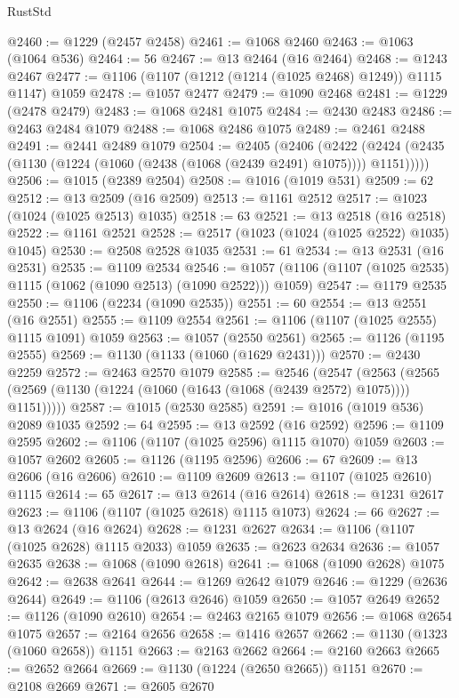 \begin{lexlean}{RustStd}
\begin{coremodule}
@2460 := @1229 (@2457 @2458)
@2461 := @1068 @2460
@2463 := @1063 (@1064 @536)
@2464 := 56
@2467 := @13 @2464 (@16 @2464)
@2468 := @1243 @2467
@2477 := @1106 (@1107 (@1212 (@1214 (@1025 @2468) @1249)) @1115 @1147) @1059
@2478 := @1057 @2477
@2479 := @1090 @2468
@2481 := @1229 (@2478 @2479)
@2483 := @1068 @2481 @1075
@2484 := @2430 @2483
@2486 := @2463 @2484 @1079
@2488 := @1068 @2486 @1075
@2489 := @2461 @2488
@2491 := @2441 @2489 @1079
@2504 := @2405
    (@2406
      (@2422 (@2424 (@2435 (@1130 (@1224 (@1060 (@2438 (@1068 (@2439 @2491) @1075)))) @1151)))))
@2506 := @1015 (@2389 @2504)
@2508 := @1016 (@1019 @531)
@2509 := 62
@2512 := @13 @2509 (@16 @2509)
@2513 := @1161 @2512
@2517 := @1023 (@1024 (@1025 @2513) @1035)
@2518 := 63
@2521 := @13 @2518 (@16 @2518)
@2522 := @1161 @2521
@2528 := @2517 (@1023 (@1024 (@1025 @2522) @1035) @1045)
@2530 := @2508 @2528 @1035
@2531 := 61
@2534 := @13 @2531 (@16 @2531)
@2535 := @1109 @2534
@2546 := @1057 (@1106 (@1107 (@1025 @2535) @1115 (@1062 (@1090 @2513) (@1090 @2522))) @1059)
@2547 := @1179 @2535
@2550 := @1106 (@2234 (@1090 @2535))
@2551 := 60
@2554 := @13 @2551 (@16 @2551)
@2555 := @1109 @2554
@2561 := @1106 (@1107 (@1025 @2555) @1115 @1091) @1059
@2563 := @1057 (@2550 @2561)
@2565 := @1126 (@1195 @2555)
@2569 := @1130 (@1133 (@1060 (@1629 @2431)))
@2570 := @2430 @2259
@2572 := @2463 @2570 @1079
@2585 := @2546
    (@2547
      (@2563 (@2565 (@2569 (@1130 (@1224 (@1060 (@1643 (@1068 (@2439 @2572) @1075)))) @1151)))))
@2587 := @1015 (@2530 @2585)
@2591 := @1016 (@1019 @536) @2089 @1035
@2592 := 64
@2595 := @13 @2592 (@16 @2592)
@2596 := @1109 @2595
@2602 := @1106 (@1107 (@1025 @2596) @1115 @1070) @1059
@2603 := @1057 @2602
@2605 := @1126 (@1195 @2596)
@2606 := 67
@2609 := @13 @2606 (@16 @2606)
@2610 := @1109 @2609
@2613 := @1107 (@1025 @2610) @1115
@2614 := 65
@2617 := @13 @2614 (@16 @2614)
@2618 := @1231 @2617
@2623 := @1106 (@1107 (@1025 @2618) @1115 @1073)
@2624 := 66
@2627 := @13 @2624 (@16 @2624)
@2628 := @1231 @2627
@2634 := @1106 (@1107 (@1025 @2628) @1115 @2033) @1059
@2635 := @2623 @2634
@2636 := @1057 @2635
@2638 := @1068 (@1090 @2618)
@2641 := @1068 (@1090 @2628) @1075
@2642 := @2638 @2641
@2644 := @1269 @2642 @1079
@2646 := @1229 (@2636 @2644)
@2649 := @1106 (@2613 @2646) @1059
@2650 := @1057 @2649
@2652 := @1126 (@1090 @2610)
@2654 := @2463 @2165 @1079
@2656 := @1068 @2654 @1075
@2657 := @2164 @2656
@2658 := @1416 @2657
@2662 := @1130 (@1323 (@1060 @2658)) @1151
@2663 := @2163 @2662
@2664 := @2160 @2663
@2665 := @2652 @2664
@2669 := @1130 (@1224 (@2650 @2665)) @1151
@2670 := @2108 @2669
@2671 := @2605 @2670

\end{coremodule}
\end{lexlean}
